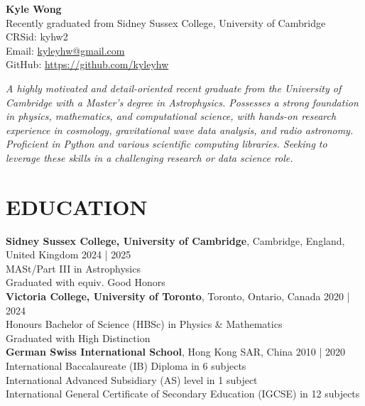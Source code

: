 \documentclass[a4paper,10pt]{extarticle}
\begin{document}
\pagestyle{fancy}
\renewcommand{\headrulewidth}{0pt}
\fancyhead{}
\fancyhead[R]{\textit{\monthyeardate\today}}
\thispagestyle{empty} %

\begin{flushleft}
\textbf{\LARGE Kyle Wong}\\[0.5em] %
Recently graduated from Sidney Sussex College, University of Cambridge
\\ {CRSid: kyhw2} 
\\ Email: \href{mailto:kyleyhw@gmail.com}{kyleyhw@gmail.com} %
\\ GitHub: \url{https://github.com/kyleyhw}

\vspace{1em}
\textit{A highly motivated and detail-oriented recent graduate from the University of Cambridge with a Master's degree in Astrophysics. Possesses a strong foundation in physics, mathematics, and computational science, with hands-on research experience in cosmology, gravitational wave data analysis, and radio astronomy. Proficient in Python and various scientific computing libraries. Seeking to leverage these skills in a challenging research or data science role.}
\end{flushleft}

\section*{EDUCATION}
\textbf{Sidney Sussex College, University of Cambridge}, Cambridge, England, United Kingdom \hfill 2024 | 2025\\
MASt/Part III in Astrophysics\\
Graduated with equiv. Good Honors\\



\textbf{Victoria College, University of Toronto}, Toronto, Ontario, Canada \hfill 2020 | 2024\\ %
Honours Bachelor of Science (HBSc) in Physics \& Mathematics\\
Graduated with High Distinction\\


\textbf{German Swiss International School}, Hong Kong SAR, China \hfill 2010 | 2020\\ %
International Baccalaureate (IB) Diploma in 6 subjects\\
International Advanced Subsidiary (AS) level in 1 subject\\
International General Certificate of Secondary Education (IGCSE) in 12 subjects
\end{document}
